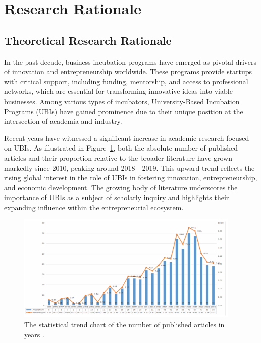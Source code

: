 \documentclass[../Main.tex]{subfiles}
\begin{document}
	\section{Research Rationale}
	\label{section:1.1_Research_rationale}
	
	\subsection{Theoretical Research Rationale}
	\label{subsection:1.1.1_Theoretical_research_rationale}
	In the past decade, business incubation programs have emerged as pivotal drivers of innovation and entrepreneurship worldwide. These programs provide startups with critical support, including funding, mentorship, and access to professional networks, which are essential for transforming innovative ideas into viable businesses. Among various types of incubators, University-Based Incubation Programs (UBIs) have gained prominence due to their unique position at the intersection of academia and industry.

	Recent years have witnessed a significant increase in academic research focused on UBIs. As illustrated in Figure~\ref{fig:ubi_publications_trend}, both the absolute number of published articles and their proportion relative to the broader literature have grown markedly since 2010, peaking around 2018 - 2019. This upward trend reflects the rising global interest in the role of UBIs in fostering innovation, entrepreneurship, and economic development. The growing body of literature underscores the importance of UBIs as a subject of scholarly inquiry and highlights their expanding influence within the entrepreneurial ecosystem.

	\begin{figure}[h]
		\centering
		\includegraphics[width=0.95\textwidth]{./Figure/published_artticle_per_year.png}
		\caption{The statistical trend chart of the number of published articles in years \autocite{Ding2024ResearchSH}.}
		\label{fig:ubi_publications_trend}
	\end{figure}
\end{document}
